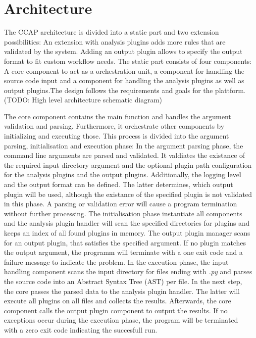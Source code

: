 \section{Architecture}
The CCAP architecture is divided into a static part and two extension possibilities: An extension with analysis plugins adds more rules that are validated by the system. Adding an output plugin allows to specify the output format to fit custom workflow needs.
The static part consists of four components: A core component to act as a orchestration unit, a  component for handling the source code input and a component for handling the analysis plugins as well as output plugins.The design follows the requirements and goals for the plattform. 
(TODO: High level architecture schematic diagram)

The core component contains the main function and handles the argument validation and parsing. Furthermore, it orchestrate other components by initializing and executing those. This process is divided into the argument parsing, initialisation and execution phase:
In the argument parsing phase, the command line arguments are parsed and validated. It valdiates the existance of the required input directory argument and the optional plugin path configuration for the analysis plugins and the output plugins. Additionally, the logging level and the output format can be defined. The latter determines, which output plugin will be used, although the existance of the specified plugin is not validated in this phase. A parsing or validation error will cause a program termination without further processing.
The initialisation phase instantiate all components and the analysis plugin handler will scan the specified directories for plugins and keeps an index of all found plugins in memory. The output plugin manager scans for an output plugin, that satisfies the specified argument. If no plugin matches the output argument, the programm will terminate with a one exit code and a failure message to indicate the problem.
In the execution phase, the input handling component scans the input directory for files ending with \textit{.py} and parses the source code into an Abstract Syntax Tree (AST) per file. In the next step, the core passes the parsed data to the analysis plugin handler. The latter will execute all plugins on all files and collects the results. Afterwards, the core component calls the output plugin component to output the results. If no exceptions occur during the execution phase, the program will be terminated with a zero exit code indicating the succesfull run.

